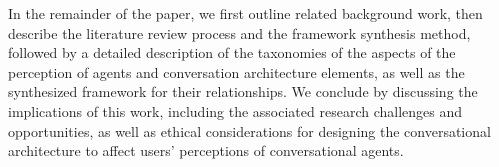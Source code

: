 In the remainder of the paper, we first outline related background work, then describe the literature review process and the framework synthesis method, %
followed by a detailed description of the taxonomies of the aspects of the perception of agents and conversation architecture elements, as well as the synthesized framework for their relationships. We conclude by discussing the implications of this work, including 
the associated research challenges and opportunities, as well as ethical considerations for designing the conversational architecture to affect users' perceptions of conversational agents.